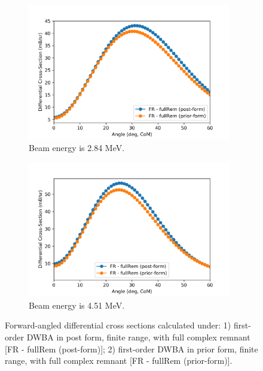  \begin{figure}[tb]
	\begin{subfigure}{0.5\textwidth}
		\centering
		\includegraphics[width=0.98\textwidth]{3MeVReactionsQ5.png}
		\caption{Beam energy is 2.84 MeV. }
		\label{fig:prior-3MeV}
	\end{subfigure}
	\begin{subfigure}{0.5\textwidth}
		\centering
		\includegraphics[width=0.98\textwidth]{5MeVReactionsQ5.png}
		\caption{Beam energy is 4.51 MeV. }
		\label{fig:prior-5MeV}
	\end{subfigure}
	\caption{Forward-angled differential cross sections calculated under: 1) first-order DWBA in post form, finite range, with full complex remnant [FR - fullRem (post-form)]; 2) first-order DWBA in prior form, finite range, with full complex remnant [FR - fullRem (prior-form)]. }
	\label{fig:prior}
\end{figure}